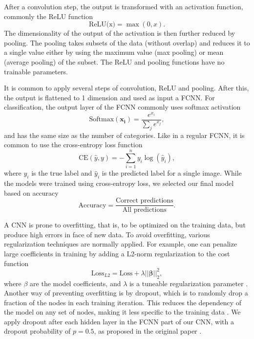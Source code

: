 After a convolution step, the output is transformed with an activation function, commonly the ReLU function
\begin{equation}
    \text{ReLU(x)} = \max(0,x).
\end{equation}
The dimensionality of the output of the activation is then further reduced by pooling. The pooling takes subsets of the data (without overlap) and reduces it to a single value either by using the maximum value (max pooling) or mean (average pooling) of the subset. The ReLU and pooling functions have no trainable parameters.

It is common to apply several steps of convolution, ReLU and pooling. After this, the output is flattened to 1 dimension and used as input a FCNN. For classification, the output layer of the FCNN commonly uses softmax activation
\begin{equation}
\label{eq:softmax}
\text{Softmax}(\mathbf{x_i}) = \frac{e^{x_i}}{\sum_{j} e^{x_j}},
\end{equation}
and has the same size as the number of categories. Like in a regular FCNN, it is common to use the cross-entropy loss function
\begin{equation}
\text{CE}(\hat{y}, y) = -\sum_{i=1}^{n} y_i \log(\hat{y}_i),
\end{equation}
where $y_i$ is the true label and $\hat{y}_i$ is the predicted label for a single image. While the models were trained using cross-entropy loss, we selected our final model based on accuracy
\begin{equation}
\text{Accuracy} = \frac{\text{Correct predictions}}{\text{All predictions}}.
\end{equation}

A CNN is prone to overfitting, that is, to be optimized on the training data, but produce high errors in face of new data. To avoid overfitting, various regularization techniques are normally applied. For example, one can penalize large coefficients in training by adding a L2-norm regularization to the cost function
\begin{equation}
    \text{Loss}_{L2} = \text{Loss} + \lambda\vert\vert \boldsymbol{\beta}\vert\vert_2^2,
\end{equation}
where $\beta$ are the model coefficients, and $\lambda$ is a tuneable regularization parameter \cite{raschka:2022:ml_pytorch_scikit}. Another way of preventing overfitting is by dropout, which is to randomly drop a fraction of the nodes in each training iteration. This reduces the dependency of the model on any set of nodes, making it less specific to the training data \cite{raschka:2022:ml_pytorch_scikit}. We apply dropout after each hidden layer in the FCNN part of our CNN, with a dropout probability of $p=0.5$, as proposed in the original paper \cite{hinton2012a}.

